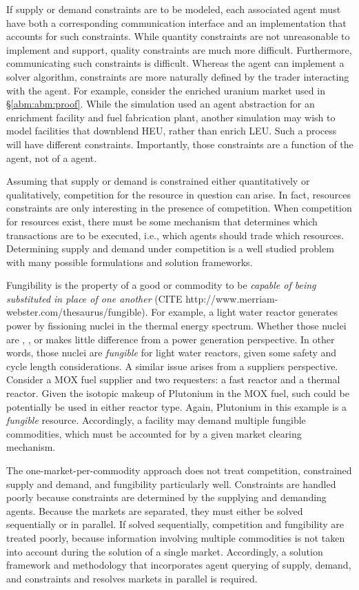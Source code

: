 If supply or demand constraints are to be modeled, each
associated  agent must have both a corresponding communication
interface and an implementation that accounts for such constraints. While
quantity constraints are not unreasonable to implement and support, quality
constraints are much more difficult. Furthermore, communicating such constraints
is difficult. Whereas the  agent can implement a solver algorithm,
constraints are more naturally defined by the trader interacting with the
 agent. For example, consider the enriched uranium market used in
\S \ref{abm:abm:proof}. While the simulation used an agent abstraction for an
enrichment facility and fuel fabrication plant, another simulation may wish to
model facilities that downblend HEU, rather than enrich LEU. Such a process will
have different constraints. Importantly, those constraints are a function of the
 agent, not of a  agent.

Assuming that supply or demand is constrained either quantitatively or
qualitatively, competition for the resource in question can arise. In fact,
resources constraints are only interesting in the presence of competition. When
competition for resources exist, there must be some mechanism that determines
which transactions are to be executed, i.e., which agents should trade which
resources. Determining supply and demand under competition is a well studied
problem with many possible formulations and solution frameworks.

Fungibility is the property of a good or commodity to be \textit{capable of
  being substituted in place of one another} (CITE
http://www.merriam-webster.com/thesaurus/fungible). For example, a light water
reactor generates power by fissioning nuclei in the thermal energy
spectrum. Whether those nuclei are , , or
 makes little difference from a power generation perspective. In
other words, those nuclei are \textit{fungible} for light water reactors, given
some safety and cycle length considerations. A similar issue arises from a
suppliers perspective. Consider a MOX fuel supplier and two requesters: a fast
reactor and a thermal reactor. Given the isotopic makeup of Plutonium in the MOX
fuel, such could be potentially be used in either reactor type. Again, Plutonium
in this example is a \textit{fungible} resource. Accordingly, a facility may
demand multiple fungible commodities, which must be accounted for by a given
market clearing mechanism.

The one-market-per-commodity approach does not treat competition, constrained
supply and demand, and fungibility particularly well. Constraints are handled
poorly because constraints are determined by the supplying and demanding
agents. Because the markets are separated, they must either be solved
sequentially or in parallel. If solved sequentially, competition and fungibility
are treated poorly, because information involving multiple commodities is not
taken into account during the solution of a single market. Accordingly, a
solution framework and methodology that incorporates agent querying of supply,
demand, and constraints and resolves markets in parallel is required.
